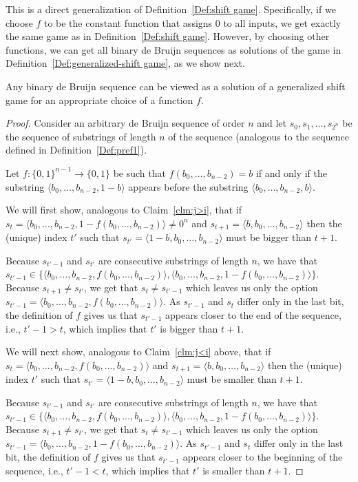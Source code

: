 \documentclass[final,12pt]{elsarticle}
\theoremstyle{definition} \newtheorem{definition}[theorem]{Definition} \newtheorem{observation}[theorem]{Observation} \newtheorem{example}[theorem]{Example} \newtheorem{remark}[theorem]{Remark} \newtheorem{corrolary}[theorem]{Corrolary}
\newcommand{\REF}[2]{#1~\ref{#2}}
\newcommand{\T}[1]{\langle{#1}\rangle} \DeclareMathOperator{\drop}{drop} \DeclareMathOperator{\dropbits}{drop\_bits} \DeclareMathOperator{\dropstates}{drop\_states} \DeclareMathOperator{\leadingForm}{LeadingForm} \DeclareMathOperator{\dv}{div} %
\begin{document}
This is a direct generalization of \REF{Definition}{Def:shift game}. Specifically, if we choose $f$ to be the constant function that assigns 0 to all inputs, we get exactly the same game as in \REF{Definition}{Def:shift game}. However, by choosing other functions, we can get all binary de Bruijn sequences as solutions of the game in \REF{Definition}{Def:generalized-shift game}, as we show next.

\begin{proposition}
	Any binary de Bruijn sequence can be viewed as a solution of a generalized shift game for an appropriate choice of a function $f$.
\end{proposition}
\begin{proof}
	Consider an arbitrary de Bruijn sequence of order $n$ and let $s_0, s_1, \dots, s_{2^n}$ be the sequence of substrings of length $n$ of the sequence (analogous to the sequence defined in Definition~\ref{Def:pref1}). 
	
	Let $f\colon \{0,1\}^{n-1} \to \{0,1\}$ be such that $f(b_0,\dots,b_{n-2})=b$ if and only if the substring $\T{b_0,\dots,b_{n-2},1-b}$ appears before the substring $\T{b_0,\dots,b_{n-2},b}$. 
	
	We will first show, analogous to  Claim~\ref{clm:j>i}, that if $s_t=\langle b_0,\dots,b_{n-2},1-f(b_0,\dots,b_{n-2})\rangle \neq 0^n$ and $s_{t+1}=\langle b,b_0,\dots,b_{n-2}\rangle$ then the (unique) index $t'$ such that $s_{t'}=\T{1-b,b_0,\dots,b_{n-2}}$ must be bigger than $t+1$. 
	
	Because $s_{t'-1}$ and $s_{t'}$ are consecutive substrings of length $n$, we have that $s_{t'-1} \in \{ \langle b_0,\dots,b_{n-2},f(b_0,\dots,b_{n-2})\rangle, \langle b_0,\dots,b_{n-2},1-f(b_0,\dots,b_{n-2}) \rangle \}$. Because $s_{t+1} \neq s_{t'}$, we get that $s_{t} \neq s_{t'-1}$ which leaves us only the option $s_{t'-1}=\T{b_0,\dots,b_{n-2},f(b_0,\dots,b_{n-2})}$. As $s_{t'-1}$ and $s_{t}$ differ only in the last bit, the definition of $f$ gives us that $s_{t'-1}$ appears closer to the end of the sequence, i.e., $t'-1 > t$, which implies that $t'$ is bigger than $t+1$.

	We will next show, analogous to  Claim~\ref{clm:j<i} above, that if $s_t=\T{b_0,\dots,b_{n-2},f(b_0,\dots,b_{n-2})}$ and $s_{t+1}=\T{b,b_0,\dots,b_{n-2}}$ then the (unique) index $t'$ such that $s_{t'}=\T{1-b,b_0,\dots,b_{n-2}}$ must be smaller than $t+1$. 

	Because $s_{t'-1}$ and $s_{t'}$ are consecutive substrings of length $n$, we have that $s_{t'-1} \in \{ \langle b_0,\dots,b_{n-2},f(b_0,\dots,b_{n-2})\rangle, \langle b_0,\dots,b_{n-2},1-f(b_0,\dots,b_{n-2}) \rangle \}$. Because $s_{t+1} \neq s_{t'}$, we get that $s_{t} \neq s_{t'-1}$ which leaves us only the option $s_{t'-1}=\T{b_0,\dots,b_{n-2},1-f(b_0,\dots,b_{n-2})}$. As $s_{t'-1}$ and $s_{t}$ differ only in the last bit, the definition of $f$ gives us that $s_{t'-1}$ appears closer to the beginning of the sequence, i.e., $t'-1 < t$, which implies that $t'$ is smaller than $t+1$.
	

\end{proof}
\end{document}

